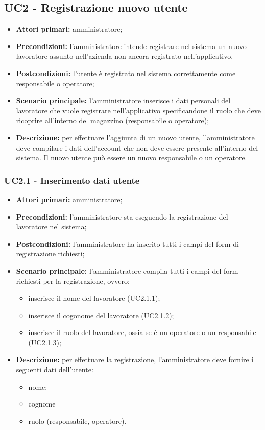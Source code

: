 \subsection{UC2 - Registrazione nuovo utente}

\begin{itemize}
	\item 	\textbf{Attori primari:} amministratore;
	\item 	\textbf{Precondizioni:}	l'amministratore intende registrare nel sistema un nuovo lavoratore assunto nell'azienda non ancora registrato nell'applicativo.
	\item 	\textbf{Postcondizioni:} l’utente è registrato nel sistema correttamente come responsabile o operatore;
	\item 	\textbf{Scenario principale:} l'amministratore inserisce i dati personali del lavoratore che vuole registrare nell'applicativo specificandone il ruolo che deve ricoprire all'interno del magazzino (responsabile o operatore);
	\item 	\textbf{Descrizione:} per effettuare l'aggiunta di un nuovo utente, l'amministratore deve compilare i dati dell'account che non deve essere presente all'interno del sistema. Il nuovo utente può essere un nuovo responsabile o un operatore.

\end{itemize}

\subsubsection{UC2.1 - Inserimento dati utente}
\begin{itemize}
	\item 	\textbf{Attori primari:} amministratore;
	\item 	\textbf{Precondizioni:}	l'amministratore sta eseguendo la registrazione del lavoratore nel sistema;
	\item 	\textbf{Postcondizioni:} l'amministratore ha inserito tutti i campi del form di registrazione richiesti;
	\item 	\textbf{Scenario principale:} l'amministratore compila tutti i campi del form richiesti per la registrazione, ovvero:
	\begin{itemize}
		\item inserisce il nome del lavoratore (UC2.1.1);
		\item inserisce il cogonome del lavoratore (UC2.1.2);
		\item inserisce il ruolo del lavoratore, ossia se è un operatore o un responsabile (UC2.1.3);
	\end{itemize}
	\item 	\textbf{Descrizione:} per effettuare la registrazione, l'amministratore deve fornire i seguenti dati dell'utente:
	\begin{itemize}
		\item nome;
		\item cognome
		\item ruolo (responsabile, operatore).
	\end{itemize}

\end{itemize}

